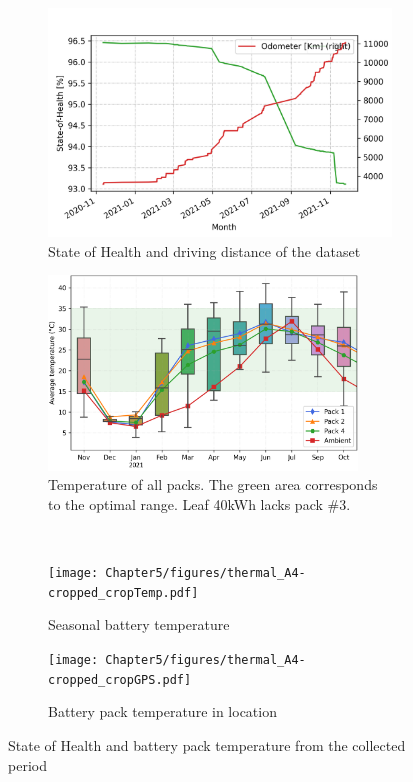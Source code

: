 \begin{figure}[htbp]
    \centering
	\begin{subfigure}{0.47\linewidth}
        \includegraphics[width=\textwidth]{Chapter5/figures/ch5_SOH_Odometer_colored.png} 
        \caption{State of Health and driving distance of the dataset}
        \label{fig:soh_odometer}
	\end{subfigure}
    \quad
    \begin{subfigure}{0.43\linewidth}
        \includegraphics[width=0.9\textwidth]{Chapter5/figures/BAT_SEASONAL_PACK_MEAN.png}
        \caption{Temperature of all packs. The green area corresponds to the optimal range. Leaf 40kWh lacks pack \#3.}
        \label{fig:avg_pack_temp}
	\end{subfigure}
    \\
    \begin{subfigure}{0.45\linewidth}
        \texttt{[image: Chapter5/figures/thermal\_A4-cropped\_cropTemp.pdf]}
        \caption{Seasonal battery temperature}
        \label{fig:seasonal_temp}
    \end{subfigure}
    \quad
    \begin{subfigure}{0.45\linewidth}
        \texttt{[image: Chapter5/figures/thermal\_A4-cropped\_cropGPS.pdf]}
        \caption{Battery pack temperature in location}
        \label{fig:pack_location_temp}
    \end{subfigure}
    \caption{State of Health and battery pack temperature from the collected period}
    \label{fig:expanded_setup}
\end{figure}

